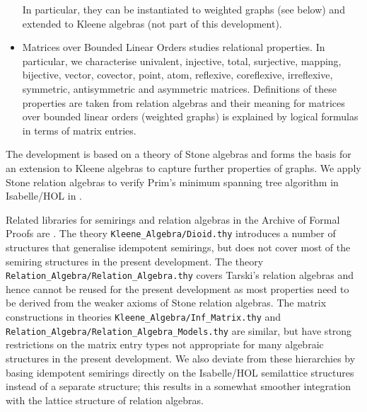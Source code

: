 \documentclass[11pt,a4paper]{article}
\begin{document}
\begin{itemize}
      In particular, they can be instantiated to weighted graphs (see below) and extended to Kleene algebras (not part of this development).
\item Matrices over Bounded Linear Orders studies relational properties.
      In particular, we characterise univalent, injective, total, surjective, mapping, bijective, vector, covector, point, atom, reflexive, coreflexive, irreflexive, symmetric, antisymmetric and asymmetric matrices.
      Definitions of these properties are taken from relation algebras and their meaning for matrices over bounded linear orders (weighted graphs) is explained by logical formulas in terms of matrix entries.
\end{itemize}
The development is based on a theory of Stone algebras \cite{Guttmann2016b} and forms the basis for an extension to Kleene algebras to capture further properties of graphs.
We apply Stone relation algebras to verify Prim's minimum spanning tree algorithm in Isabelle/HOL in \cite{Guttmann2016c}.

Related libraries for semirings and relation algebras in the Archive of Formal Proofs are \cite{ArmstrongFosterStruthWeber2016,ArmstrongGomesStruthWeber2016}.
The theory \texttt{Kleene\_Algebra/Dioid.thy} introduces a number of structures that generalise idempotent semirings, but does not cover most of the semiring structures in the present development.
The theory \texttt{Relation\_Algebra/Relation\_Algebra.thy} covers Tarski's relation algebras and hence cannot be reused for the present development as most properties need to be derived from the weaker axioms of Stone relation algebras.
The matrix constructions in theories \texttt{Kleene\_Algebra/Inf\_Matrix.thy} and \texttt{Relation\_Algebra/Relation\_Algebra\_Models.thy} are similar, but have strong restrictions on the matrix entry types not appropriate for many algebraic structures in the present development.
We also deviate from these hierarchies by basing idempotent semirings directly on the Isabelle/HOL semilattice structures instead of a separate structure; this results in a somewhat smoother integration with the lattice structure of relation algebras.

\begin{flushleft}

\end{flushleft}



\end{document}
